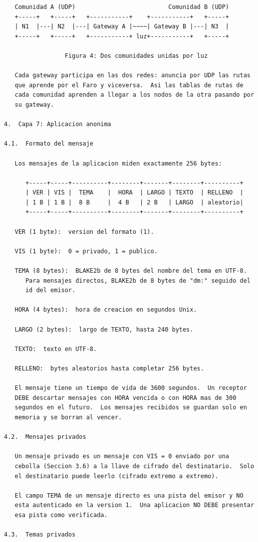 \newpage
\begin{Verbatim}
   Comunidad A (UDP)                          Comunidad B (UDP)
   +-----+   +-----+   +-----------+    +-----------+   +-----+
   | N1  |---| N2  |---| Gateway A |~~~~| Gateway B |---| N3  |
   +-----+   +-----+   +-----------+ luz+-----------+   +-----+

                 Figura 4: Dos comunidades unidas por luz

   Cada gateway participa en las dos redes: anuncia por UDP las rutas
   que aprende por el Faro y viceversa.  Asi las tablas de rutas de
   cada comunidad aprenden a llegar a los nodos de la otra pasando por
   su gateway.

4.  Capa 7: Aplicacion anonima

4.1.  Formato del mensaje

   Los mensajes de la aplicacion miden exactamente 256 bytes:

      +-----+-----+----------+--------+-------+--------+----------+
      | VER | VIS |  TEMA    |  HORA  | LARGO | TEXTO  | RELLENO  |
      | 1 B | 1 B |  8 B     |  4 B   | 2 B   | LARGO  | aleatorio|
      +-----+-----+----------+--------+-------+--------+----------+

   VER (1 byte):  version del formato (1).

   VIS (1 byte):  0 = privado, 1 = publico.

   TEMA (8 bytes):  BLAKE2b de 8 bytes del nombre del tema en UTF-8.
      Para mensajes directos, BLAKE2b de 8 bytes de "dm:" seguido del
      id del emisor.

   HORA (4 bytes):  hora de creacion en segundos Unix.

   LARGO (2 bytes):  largo de TEXTO, hasta 240 bytes.

   TEXTO:  texto en UTF-8.

   RELLENO:  bytes aleatorios hasta completar 256 bytes.

   El mensaje tiene un tiempo de vida de 3600 segundos.  Un receptor
   DEBE descartar mensajes con HORA vencida o con HORA mas de 300
   segundos en el futuro.  Los mensajes recibidos se guardan solo en
   memoria y se borran al vencer.

4.2.  Mensajes privados

   Un mensaje privado es un mensaje con VIS = 0 enviado por una
   cebolla (Seccion 3.6) a la llave de cifrado del destinatario.  Solo
   el destinatario puede leerlo (cifrado extremo a extremo).

   El campo TEMA de un mensaje directo es una pista del emisor y NO
   esta autenticado en la version 1.  Una aplicacion NO DEBE presentar
   esa pista como verificada.

4.3.  Temas privados
\end{Verbatim}
